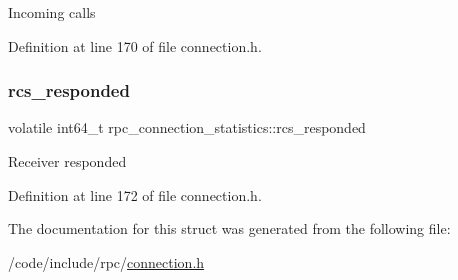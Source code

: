 Incoming calls 

Definition at line 170 of file connection.\+h.

\mbox{\label{structrpc__connection__statistics_a9c9cd982c4e9c548175e11e5a6a19401}} 
\subsubsection{\texorpdfstring{rcs\+\_\+responded}{rcs\_responded}}
{\footnotesize\ttfamily volatile int64\+\_\+t rpc\+\_\+connection\+\_\+statistics\+::rcs\+\_\+responded}

Receiver responded 

Definition at line 172 of file connection.\+h.



The documentation for this struct was generated from the following file\+:\begin{DoxyCompactItemize}
\item 
/code/include/rpc/\hyperlink{connection_8h}{connection.\+h}\end{DoxyCompactItemize}
